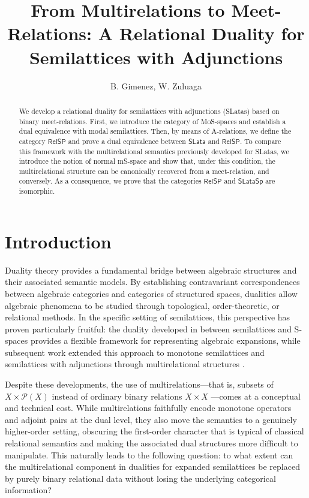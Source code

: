 \documentclass{article}
\title{From Multirelations to Meet-Relations:
A Relational Duality for Semilattices with Adjunctions}
\author{B. Gimenez, W. Zuluaga}
\date{}
\begin{document}
\maketitle

\begin{abstract}
\noindent
We develop a relational duality for semilattices with adjunctions (SLatas) based on binary meet-relations. First, we introduce the category of MoS-spaces and establish a dual equivalence with modal semilattices. Then, by means of A-relations, we define the category $\mathsf{RelSP}$ and prove a dual equivalence between $\mathsf{SLata}$ and $\mathsf{RelSP}$. To compare this framework with the multirelational semantics previously developed for SLatas, we introduce the notion of normal mS-space and show that, under this condition, the multirelational structure can be canonically recovered from a meet-relation, and conversely. As a consequence, we prove that the categories $\mathsf{RelSP}$ and $\mathsf{SLataSp}$ are isomorphic.
\end{abstract}


\section{Introduction}

Duality theory provides a fundamental bridge between algebraic structures and their associated semantic models. By establishing contravariant correspondences between algebraic categories and categories of structured spaces, dualities allow algebraic phenomena to be studied through topological, order-theoretic, or relational methods.  In the specific setting of semilattices, this perspective has proven particularly fruitful: the duality developed in \cite{CG} between semilattices and S-spaces provides a flexible framework for representing algebraic expansions, while subsequent work extended this approach to monotone semilattices and semilattices with adjunctions through multirelational structures \cite{P W,GPZ}.

Despite these developments, the use of multirelations---that is, subsets of
$
X\times \mathcal{P}(X)
$
instead of ordinary binary relations
$
X\times X
$
---comes at a conceptual and technical cost. While multirelations faithfully encode monotone operators and adjoint pairs at the dual level, they also move the semantics to a genuinely higher-order setting, obscuring the first-order character that is typical of classical relational semantics and making the associated dual structures more difficult to manipulate. This naturally leads to the following question: to what extent can the multirelational component in dualities for expanded semilattices be replaced by purely binary relational data without losing the underlying categorical information?
\medskip
\end{document}
